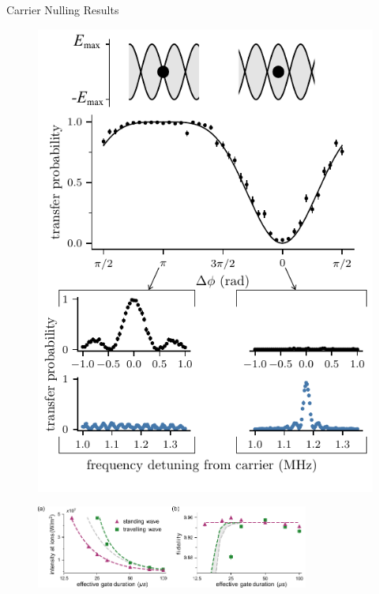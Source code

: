 \documentclass[final]{beamer}
\begin{document}
\begin{frame}{}
\begin{center}
\begin{columns}[t]
\begin{column}{0.49\textwidth}
\begin{alertblock}{Carrier Nulling Results}
\begin{minipage}{0.34\linewidth}
\begin{figure}
{        \includegraphics[width=\textwidth]{./figs/Figure_2_v2.pdf}
        }
      \end{figure}
      \end{minipage}
      \begin{figure}
        \includegraphics[width=0.8\textwidth]{./figs/two_qubit_gate_figure_h.pdf}
      \end{figure}
    \end{alertblock}



\end{column}
\end{columns}
\end{center}
\end{frame}
\end{document}
